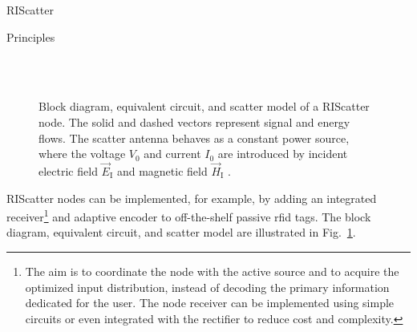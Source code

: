 \begin{section}{RIScatter}
\begin{subsection}{Principles}
		\begin{figure}[H]
			\centering
			\\
			\\
			\caption{
			Block diagram, equivalent circuit, and scatter model of a RIScatter node.
			The solid and dashed vectors represent signal and energy flows.
			The scatter antenna behaves as a constant power source, where the voltage $V_0$ and current $I_0$ are introduced by incident electric field $\vec{E}_{\text{I}}$ and magnetic field $\vec{H}_{\text{I}}$ \cite{Huang2021}.
			}
			\label{fg:riscatter_node}
		\end{figure}
		RIScatter nodes can be implemented, for example, by adding an integrated receiver\footnote{The aim is to coordinate the node with the active source and to acquire the optimized input distribution, instead of decoding the primary information dedicated for the user. The node receiver can be implemented using simple circuits or even integrated with the rectifier \cite{Kim2021a} to reduce cost and complexity.\label{fn:integrated_receiver}} \cite{Kim2021a} and adaptive encoder \cite{He2020e} to off-the-shelf passive \gls{rfid} tags.
		The block diagram, equivalent circuit, and scatter model are illustrated in Fig.~\ref{fg:riscatter_node}.
	\end{subsection}


\end{section}
